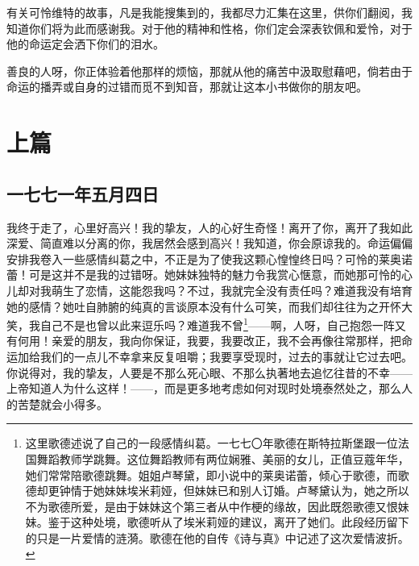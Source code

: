 \documentclass[11pt,oneside]{book}
\begin{document}
\frontmatter

\author{歌德}
\titleLA


\setcounter{tocdepth}{0}
\tableofcontents

\begin{common-format}
\mainmatter

\begin{flushright}
\notefont
\begin{notecard}
有关可怜维特的故事，凡是我能搜集到的，我都尽力汇集在这里，供你们翻阅，我知道你们将为此而感谢我。对于他的精神和性格，你们定会深表钦佩和爱怜，对于他的命运定会洒下你们的泪水。

善良的人呀，你正体验着他那样的烦恼，那就从他的痛苦中汲取慰藉吧，倘若由于命运的播弄或自身的过错而觅不到知音，那就让这本小书做你的朋友吧。
\end{notecard}
\end{flushright}
\newpage 


\chapter{上篇}

\section{一七七一年五月四日}
我终于走了，心里好高兴！我的挚友，人的心好生奇怪！离开了你，离开了我如此深爱、简直难以分离的你，我居然会感到高兴！我知道，你会原谅我的。命运偏偏安排我卷入一些感情纠葛之中，不正是为了使我这颗心惶惶终日吗？可怜的莱奥诺蕾！可是这并不是我的过错呀。她妹妹独特的魅力令我赏心惬意，而她那可怜的心儿却对我萌生了恋情，这能怨我吗？不过，我就完全没有责任吗？难道我没有培育她的感情？她吐自肺腑的纯真的言谈原本没有什么可笑，而我们却往往为之开怀大笑，我自己不是也曾以此来逗乐吗？难道我不曾\footnote{这里歌德述说了自己的一段感情纠葛。一七七〇年歌德在斯特拉斯堡跟一位法国舞蹈教师学跳舞。这位舞蹈教师有两位娴雅、美丽的女儿，正值豆蔻年华，她们常常陪歌德跳舞。姐姐卢琴黛，即小说中的莱奥诺蕾，倾心于歌德，而歌德却更钟情于她妹妹埃米莉娅，但妹妹已和别人订婚。卢琴黛认为，她之所以不为歌德所爱，是由于妹妹这个第三者从中作梗的缘故，因此既怨歌德又恨妹妹。鉴于这种处境，歌德听从了埃米莉娅的建议，离开了她们。此段经历留下的只是一片爱情的涟漪。歌德在他的自传《诗与真》中记述了这次爱情波折。}——啊，人呀，自己抱怨一阵又有何用！亲爱的朋友，我向你保证，我要，我要改正，我不会再像往常那样，把命运加给我们的一点儿不幸拿来反复咀嚼；我要享受现时，过去的事就让它过去吧。你说得对，我的挚友，人要是不那么死心眼、不那么执著地去追忆往昔的不幸——上帝知道人为什么这样！——，而是更多地考虑如何对现时处境泰然处之，那么人的苦楚就会小得多。


\end{common-format}
\end{document}
